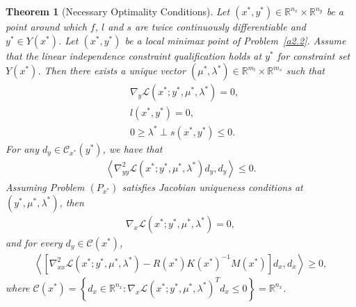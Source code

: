 \documentclass{article}
\newtheorem{theorem}{Theorem}
\begin{document}
	\begin{theorem}[Necessary Optimality Conditions]\label{second-order theorem necessary}
		Let $(x^{\ast}, y^{\ast}) \in \mathbb{R}^{n_{x}} \times \mathbb{R}^{n_{y}}$ be a point around which $f$, $l$ and $s$ are twice continuously differentiable and $y^{\ast} \in Y(x^{\ast})$. Let $(x^{\ast}, y^{\ast})$ be a local minimax point of Problem~\eqref{a2.2}. Assume that the linear independence constraint qualification holds at $y^{\ast}$ for constraint set $Y(x^{\ast})$. Then there exists a unique vector $(\mu^{\ast}, \lambda^{\ast}) \in \mathbb{R}^{m_{l}} \times \mathbb{R}^{m_{s}}$ such that
		\begin{align*}
			& \nabla_{y} \mathcal{L}(x^{\ast}; y^{\ast}, \mu^{\ast}, \lambda^{\ast}) = 0,\\
			& l(x^{\ast}, y^{\ast}) = 0,\\
			& 0 \geq \lambda^{\ast} \perp s(x^{\ast}, y^{\ast}) \leq 0.
		\end{align*}
		For any $d_{y} \in \mathcal{C}_{x^{\ast}}(y^{\ast})$, we have that
		\begin{align*}
			\left\langle \nabla_{yy}^{2}\mathcal{L}(x^{\ast}; y^{\ast}, \mu^{\ast}, \lambda^{\ast})d_{y}, d_{y}\right\rangle \leq 0.
		\end{align*}
		Assuming Problem $(P_{x^{\ast}})$ satisfies Jacobian uniqueness conditions at $(y^{\ast}, \mu^{\ast}, \lambda^{\ast})$, then
		\begin{align*}
			\nabla_{x} \mathcal{L}(x^{\ast}; y^{\ast}, \mu^{\ast}, \lambda^{\ast}) = 0,
		\end{align*}
		and for every $d_{y}\in \mathcal{C}(x^{\ast})$,
		\begin{align*}
			\left\langle \left[\nabla_{xx}^{2}\mathcal{L}(x^{\ast}; y^{\ast}, \mu^{\ast}, \lambda^{\ast}) - R(x^{\ast})K(x^{\ast})^{-1}M(x^{\ast})\right]d_{x}, d_{x}\right\rangle \geq 0,
		\end{align*}
		where $\mathcal{C}(x^{\ast}) = \left\lbrace d_{x}\in\mathbb{R}^{n_{x}} : \nabla_{x} \mathcal{L}(x^{\ast}; y^{\ast}, \mu^{\ast}, \lambda^{\ast})^{T}d_{x} \leq 0\right\rbrace = \mathbb{R}^{n_{x}}$.
	\end{theorem}
	
\end{document}
